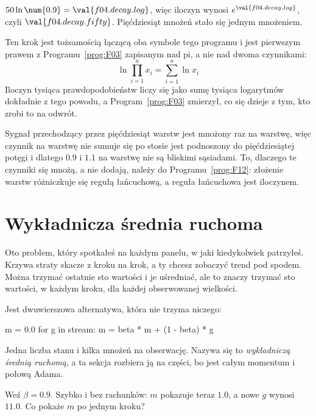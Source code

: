 \begin{fr}
\begin{ansblock}
$50 \ln \num{0.9} = \val{f04.decay.log}$, więc iloczyn wynosi
$e^{\val{f04.decay.log}}$, czyli $\val{f04.decay.fifty}$. Pięćdziesiąt mnożeń
stało się jednym mnożeniem.
\end{ansblock}

Ten krok jest tożsamością łączącą oba symbole tego programu i jest pierwszym
prawem z Programu~\ref{prog:F03} zapisanym nad pi, a nie nad dwoma czynnikami:
\[ \ln \prod_{i=1}^{n} x_i = \sum_{i=1}^{n} \ln x_i \]
Iloczyn tysiąca prawdopodobieństw liczy się jako sumę tysiąca logarytmów
dokładnie z tego powodu, a Program~\ref{prog:F03} zmierzył, co się dzieje z
tym, kto zrobi to na odwrót.

Sygnał przechodzący przez pięćdziesiąt warstw jest mnożony raz na warstwę,
więc czynnik na warstwę nie sumuje się po stosie \dash{} jest podnoszony do
pięćdziesiątej potęgi i dlatego $\num{0.9}$ i $\num{1.1}$ na warstwę nie są
bliskimi sąsiadami. To, dlaczego te czynniki się mnożą, a nie dodają, należy
do Programu~\ref{prog:F12}: złożenie warstw różniczkuje się regułą
łańcuchową, a reguła łańcuchowa jest iloczynem.
\end{fr}

\section{Wykładnicza średnia ruchoma}
\label{sec:F04-ema}

\begin{fr}
Oto problem, który spotkałeś na każdym panelu, w jaki kiedykolwiek patrzyłeś.
Krzywa straty skacze z kroku na krok, a ty chcesz zobaczyć trend pod spodem.
Można trzymać ostatnie sto wartości i je uśredniać, ale to znaczy trzymać sto
wartości, w każdym kroku, dla każdej obserwowanej wielkości.

Jest dwuwierszowa alternatywa, która nie trzyma niczego:

\begin{python}
m = 0.0
for g in stream:
    m = beta * m + (1 - beta) * g
\end{python}

Jedna liczba stanu i kilka mnożeń na obserwację. Nazywa się to
\emph{wykładniczą średnią ruchomą}, a ta sekcja rozbiera ją na części, bo jest
całym momentum i połową Adama.

Weź $\beta = \num{0.9}$. Szybko i bez rachunków: $m$ pokazuje teraz
$\num{1.0}$, a nowe $g$ wynosi $\num{11.0}$. Co pokaże $m$ po jednym kroku?
\dotline
\nextframe
\end{fr}

